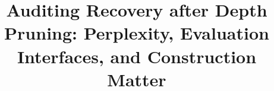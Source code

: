 \documentclass[11pt]{article}
\title{Auditing Recovery after Depth Pruning:
Perplexity, Evaluation Interfaces, and Construction Matter}
\author{}
\begin{document}
\maketitle








\FloatBarrier
	
	\FloatBarrier
	
	\FloatBarrier
	\clearpage
	
	

\clearpage


\clearpage
\appendix
\raggedbottom

\end{document}
